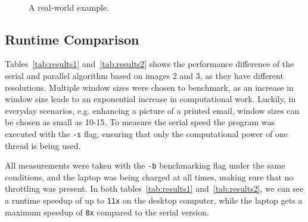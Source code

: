 \documentclass[sigconf]{acmart}
\begin{document}
\begin{figure}
     \\
    \caption{A real-world example. }
    \label{fig*:comparison3}
\end{figure}


\subsection{Runtime Comparison}
Tables~\ref{tab:results1} and~\ref{tab:results2} shows the performance difference of the serial and parallel algorithm based on images 2 and 3, as they have different resolutions. Multiple window sizes were chosen to benchmark, as an increase in window size leads to an exponential increase in computational work. Luckily, in everyday scenarios, e.g. enhancing a picture of a printed email, window sizes can be chosen as small as 10-15.  
To measure the serial speed the program was executed with the \texttt{-s} flag, ensuring that only the computational power of one thread is being used.

All measurements were taken with the \texttt{-b} benchmarking flag under the same conditions, and the laptop was being charged at all times, making sure that no throttling was present. In both tables~\ref{tab:results1} and~\ref{tab:results2}, we can see a runtime speedup of up to \texttt{11x} on the desktop computer, while the laptop gets a maximum speedup of \texttt{8x} compared to the serial version.\newline 
\end{document}
